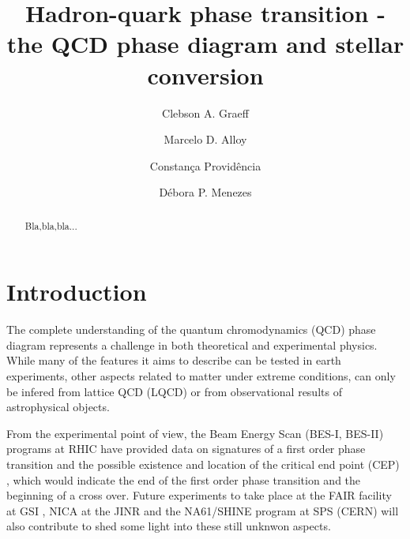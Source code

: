 \documentclass[prc, reprint, amsmath, floatfix,10pt]{revtex4-1}
\begin{document}

%
%

\title{Hadron-quark phase transition - the QCD phase diagram and stellar conversion}

\author{Clebson A. Graeff}

\author{Marcelo D. Alloy}

\author{Constança Providência}

\author{Débora P. Menezes}


\begin{abstract}
Bla,bla,bla...
\end{abstract}

\maketitle

\section{Introduction}

The complete understanding of the quantum chromodynamics (QCD) phase diagram represents a challenge in both theoretical and experimental physics. While many of the features it aims to describe can be tested in earth experiments, other aspects related to matter under extreme conditions, can only be infered from lattice QCD (LQCD) \cite{lqcd} or from observational results of astrophysical objects.

From the experimental point of view, the Beam Energy Scan (BES-I,
BES-II) programs at RHIC have provided 
data on signatures of a first order phase transition and
the possible existence and location of the critical end point (CEP)
\cite{BES}, which would indicate the end of the first order phase
transition and the beginning of a cross over. Future
experiments to take place at the FAIR facility at GSI \cite{FAIR} ,
NICA at the JINR \cite{NICA} and the NA61/SHINE program at SPS (CERN)
\cite{NA61} will also contribute to shed some light into these still unknwon aspects.
\end{document}
